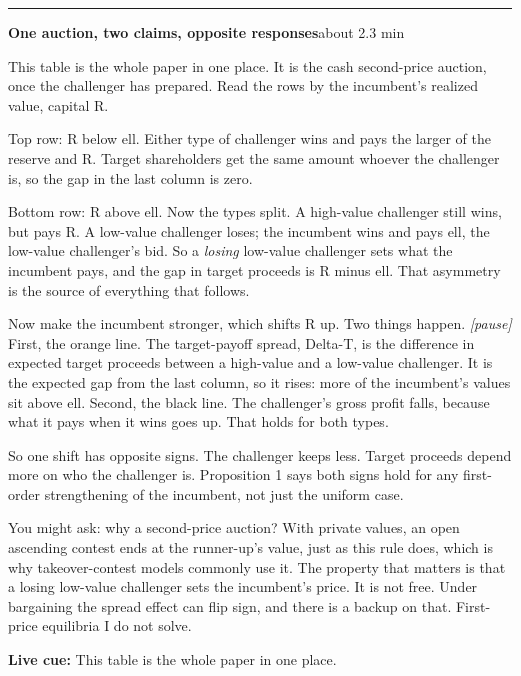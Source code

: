 \documentclass[11pt]{article}
\newcommand{\Pause}{\textcolor{ScriptGray}{\textit{[pause]}}}
\newcommand{\Cue}[1]{\par\nobreak\smallskip\noindent
  \textcolor{ScriptGray}{\footnotesize\textbf{Live cue:} #1}\par}
\newcommand{\scriptframe}[3]{%
  \Needspace{9\baselineskip}%
  \par\medskip\noindent\textcolor{ScriptBlue}{\rule{\linewidth}{0.55pt}}%
  \par\smallskip\noindent
  \textbf{#1}\hfill\textcolor{ScriptGray}{\small #2}\par\smallskip
  #3\par}
\begin{document}
\scriptframe{One auction, two claims, opposite responses}{about 2.3 min}{%
  This table is the whole paper in one place. It is the cash second-price
  auction, once the challenger has prepared. Read the rows by the incumbent's
  realized value, capital R.

  Top row: R below ell. Either type of challenger wins and pays the larger of
  the reserve and R. Target shareholders get the same amount whoever the
  challenger is, so the gap in the last column is zero.

  Bottom row: R above ell. Now the types split. A high-value challenger still
  wins, but pays R. A low-value challenger loses; the incumbent wins and pays
  ell, the low-value challenger's bid. So a \emph{losing} low-value challenger
  sets what the incumbent pays, and the gap in target proceeds is R minus ell.
  That asymmetry is the source of everything that follows.

  Now make the incumbent stronger, which shifts R up. Two things happen.
  \Pause{} First, the orange line. The target-payoff spread, Delta-T, is the
  difference in expected target proceeds between a high-value and a low-value
  challenger. It is the expected gap from the last column, so it rises: more of
  the incumbent's values sit above ell. Second, the black line. The challenger's
  gross profit falls, because what it pays when it wins goes up. That holds for
  both types.

  So one shift has opposite signs. The challenger keeps less. Target proceeds
  depend more on who the challenger is. Proposition 1 says both signs hold for
  any first-order strengthening of the incumbent, not just the uniform case.

  You might ask: why a second-price auction? With private values, an open
  ascending contest ends at the runner-up's value, just as this rule does, which
  is why takeover-contest models commonly use it. The property that matters is
  that a losing low-value challenger sets the incumbent's price. It is not free.
  Under bargaining the spread effect can flip sign, and there is a backup on
  that. First-price equilibria I do not solve.
  \Cue{This table is the whole paper in one place.}
}
\end{document}
